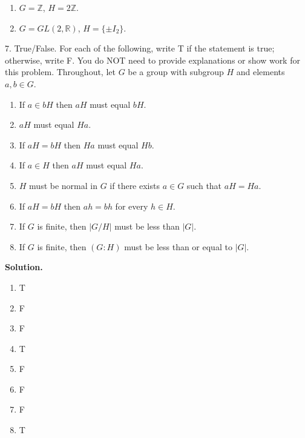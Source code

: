 \documentclass[10pt,]{book}
\theoremstyle{plain}
\theoremstyle{definition}
\theoremstyle{definition}
\theoremstyle{definition}
\theoremstyle{definition}
\numberwithin{equation}{section}
\def\Z{\mathbb{Z}}
\def\R{\mathbb{R}}
\begin{document}
\begin{exerciselist}
\begin{enumerate}[label=(\alph*)]
\item\hypertarget{li-465}{}\(G=\Z\), \(H=2\Z\).%
\item\hypertarget{li-466}{}\(G=GL(2,\R)\), \(H=\{\pm I_2\}\).%
\end{enumerate}
%
\item[7.]\hypertarget{exercise-56}{}True/False. For each of the following, write T if the statement is true; otherwise, write F. You do NOT need to provide explanations or show work for this problem. Throughout, let \(G\) be a group with subgroup \(H\) and elements \(a,b\in G\). \leavevmode%
\begin{enumerate}[label=(\alph*)]
\item\hypertarget{li-467}{}If \(a\in bH\) then \(aH\) must equal \(bH\).%
\item\hypertarget{li-468}{}\(aH\) must equal \(Ha\).%
\item\hypertarget{li-469}{}If \(aH=bH\) then \(Ha\) must equal \(Hb\).%
\item\hypertarget{li-470}{}If \(a\in H\) then \(aH\) must equal \(Ha\).%
\item\hypertarget{li-471}{}\(H\) must be normal in \(G\) if there exists \(a\in G\) such that \(aH=Ha\).%
\item\hypertarget{li-472}{}If \(aH=bH\) then \(ah=bh\) for every \(h\in H\).%
\item\hypertarget{li-473}{}If \(G\) is finite, then \(|G/H|\) must be less than \(|G|\).%
\item\hypertarget{li-474}{}If \(G\) is finite, then \((G:H)\) must be less than or equal to \(|G|\).%
\end{enumerate}
%
\par\smallskip
\par\smallskip
\noindent\textbf{Solution.}\hypertarget{solution-56}{}\quad
\leavevmode%
\begin{multicols}{4}
\begin{enumerate}[label=(\alph*)]
\item\hypertarget{li-475}{}T%
\item\hypertarget{li-476}{}F%
\item\hypertarget{li-477}{}F%
\item\hypertarget{li-478}{}T%
\item\hypertarget{li-479}{}F%
\item\hypertarget{li-480}{}F%
\item\hypertarget{li-481}{}F%
\item\hypertarget{li-482}{}T%
\end{enumerate}

\end{multicols}
\end{exerciselist}
\end{document}
